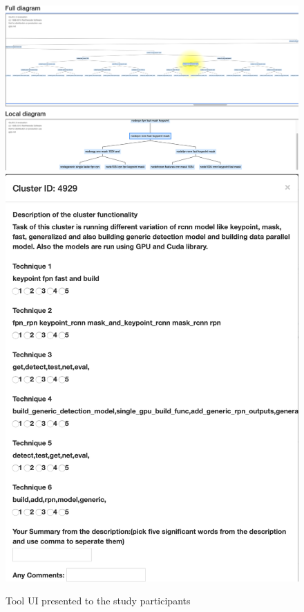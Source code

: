 \begin{figure}
    \begin{center}
    {\includegraphics[scale=0.25]{figures/hla1/ToolUI.png}}
    {\includegraphics[scale=0.23]{figures/hla1/userstudy.png}}
    \caption{Tool UI presented to the study participants}
    \label{fig:tool}
    \end{center}
\end{figure}

